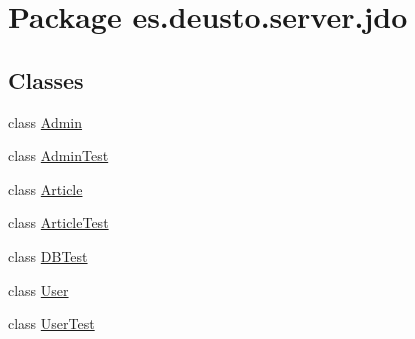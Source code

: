 \hypertarget{namespacees_1_1deusto_1_1server_1_1jdo}{}\section{Package es.\+deusto.\+server.\+jdo}
\label{namespacees_1_1deusto_1_1server_1_1jdo}
\subsection*{Classes}
\begin{DoxyCompactItemize}
\item 
class \hyperlink{classes_1_1deusto_1_1server_1_1jdo_1_1_admin}{Admin}
\item 
class \hyperlink{classes_1_1deusto_1_1server_1_1jdo_1_1_admin_test}{Admin\+Test}
\item 
class \hyperlink{classes_1_1deusto_1_1server_1_1jdo_1_1_article}{Article}
\item 
class \hyperlink{classes_1_1deusto_1_1server_1_1jdo_1_1_article_test}{Article\+Test}
\item 
class \hyperlink{classes_1_1deusto_1_1server_1_1jdo_1_1_d_b_test}{D\+B\+Test}
\item 
class \hyperlink{classes_1_1deusto_1_1server_1_1jdo_1_1_user}{User}
\item 
class \hyperlink{classes_1_1deusto_1_1server_1_1jdo_1_1_user_test}{User\+Test}
\end{DoxyCompactItemize}
